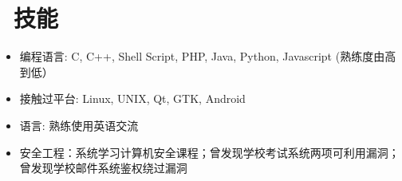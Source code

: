 \documentclass{resume}
\begin{document}
\section{\faCogs\ 技能}
\begin{itemize}[parsep=0.5ex]
  \item 编程语言: C, C++, Shell Script, PHP, Java, Python, Javascript (熟练度由高到低）
  \item 接触过平台: Linux, UNIX, Qt, GTK, Android
  \item 语言: 熟练使用英语交流
  \item 安全工程：系统学习计算机安全课程；曾发现学校考试系统两项可利用漏洞；曾发现学校邮件系统鉴权绕过漏洞
\end{itemize}
\end{document}
